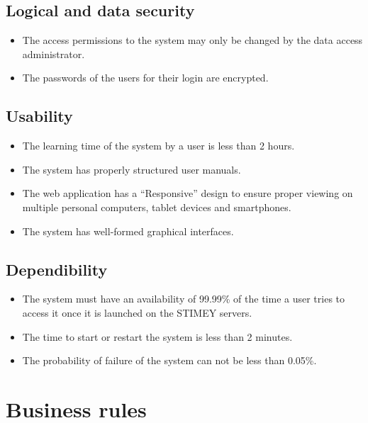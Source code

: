 \subsection{Logical and data security}

\begin{itemize}

	\item The access permissions to the system may only be changed by the data access administrator.
	\item The passwords of the users for their login are encrypted.
\end{itemize}


\subsection{Usability}

\begin{itemize}

	\item The learning time of the system by a user is less than 2 hours.
	\item The system has properly structured user manuals.
	\item The web application has a ``Responsive'' design to ensure proper viewing on multiple personal computers, tablet devices and smartphones.
	\item The system has well-formed graphical interfaces.
\end{itemize}


\subsection{Dependibility}

\begin{itemize}

	\item The system must have an availability of 99.99\% of the time a user tries to access it once it is launched on the STIMEY servers.
	\item The time to start or restart the system is less than 2 minutes.
	\item The probability of failure of the system can not be less than 0.05\%.
\end{itemize}


\section{Business rules}

